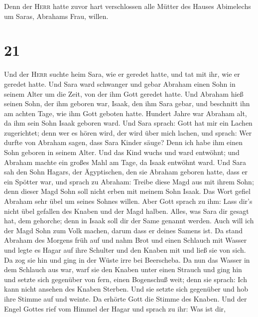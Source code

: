  Denn der \textsc{Herr} hatte zuvor hart verschlossen
alle Mütter des Hauses Abimelechs um Saras, Abrahams Frau, willen.

\hypertarget{section-20}{%
\section{21}\label{section-20}}

 Und der \textsc{Herr} suchte heim Sara, wie er geredet
hatte, und tat mit ihr, wie er geredet hatte.  Und Sara
ward schwanger und gebar Abraham einen Sohn in seinem Alter um die Zeit,
von der ihm Gott geredet hatte.  Und Abraham hieß seinen
Sohn, der ihm geboren war, Isaak, den ihm Sara gebar,  und
beschnitt ihn am achten Tage, wie ihm Gott geboten hatte. 
Hundert Jahre war Abraham alt, da ihm sein Sohn Isaak geboren ward.
 Und Sara sprach: Gott hat mir ein Lachen zugerichtet;
denn wer es hören wird, der wird über mich lachen,  und
sprach: Wer durfte von Abraham sagen, dass Sara Kinder säuge? Denn ich
habe ihm einen Sohn geboren in seinem Alter.  Und das Kind
wuchs und ward entwöhnt; und Abraham machte ein großes Mahl am Tage, da
Isaak entwöhnt ward.  Und Sara sah den Sohn Hagars, der
Ägyptischen, den sie Abraham geboren hatte, dass er ein Spötter war,
 und sprach zu Abraham: Treibe diese Magd aus mit ihrem
Sohn; denn dieser Magd Sohn soll nicht erben mit meinem Sohn Isaak.
 Das Wort gefiel Abraham sehr übel um seines Sohnes
willen.  Aber Gott sprach zu ihm: Lass dir's nicht übel
gefallen des Knaben und der Magd halben. Alles, was Sara dir gesagt hat,
dem gehorche; denn in Isaak soll dir der Same genannt werden.
 Auch will ich der Magd Sohn zum Volk machen, darum dass
er deines Samens ist.  Da stand Abraham des Morgens früh
auf und nahm Brot und einen Schlauch mit Wasser und legte es Hagar auf
ihre Schulter und den Knaben mit und ließ sie von sich. Da zog sie hin
und ging in der Wüste irre bei Beerscheba.  Da nun das
Wasser in dem Schlauch aus war, warf sie den Knaben unter einen Strauch
 und ging hin und setzte sich gegenüber von fern, einen
Bogenschuß weit; denn sie sprach: Ich kann nicht ansehen des Knaben
Sterben. Und sie setzte sich gegenüber und hob ihre Stimme auf und
weinte.  Da erhörte Gott die Stimme des Knaben. Und der
Engel Gottes rief vom Himmel der Hagar und sprach zu ihr: Was ist dir,
